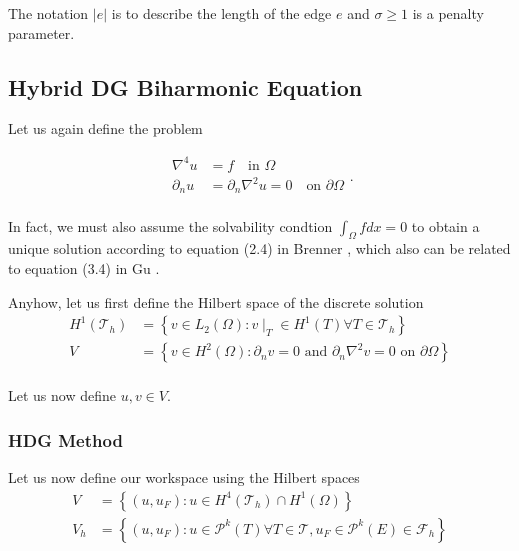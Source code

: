 The notation $\left\lvert e \right\rvert $ is to describe the length of the edge $e$ and $\sigma  \ge  1$ is a penalty
parameter.




\subsection{Hybrid DG Biharmonic Equation}%
\label{sub:hybrid_dg_biharmonic_equation}

Let us again define the problem

\begin{equation}
\label{eq:HDG_bi_problem}
\begin{split}
    \nabla ^4 u & = f \quad \text{in } \Omega   \\
    \partial _{n} u & = \partial _{n} \nabla ^2 u = 0 \quad \text{on } \partial \Omega   \\
\end{split}
.\end{equation}

In fact, we must also assume the solvability condtion $ \int_{\Omega }^{} f dx = 0$ to obtain a unique solution according to
equation (2.4) in Brenner \cite{brenner2012}, which also can be related to equation (3.4) in Gu \cite{gu2012c0}.

Anyhow,
let us first define the Hilbert space of the discrete solution \[
\begin{split}
    H^{1}\left( \mathcal{T}_{h}  \right)  & = \left\{ v \in L_{2} \left( \Omega  \right) : v  \mid _{T} \in H^{1} \left( T
    \right) \forall T \in \mathcal{T}_{h}    \right\} \\
    V &=  \left\{ v \in H^2\left( \Omega  \right) : \partial _{n} v = 0 \text{ and } \partial _{n} \nabla ^2 v = 0 \text{ on } \partial \Omega  \right\} \\
\end{split}
\]

Let us now define $u,v \in V$.

\subsubsection{HDG Method}%
\label{ssub:dg_method}
Let us now define our workspace using the Hilbert spaces
 \[
\begin{split}
    V &=  \left\{ \left( u, u_{F}  \right): u \in H^{4}\left( \mathcal{T} _{h} \right) \cap H^{1}\left( \Omega  \right)   \right\} \\
    V_{h} &=  \left\{ \left( u, u_{F}  \right) : u \in \mathcal{P} ^{k}\left( T \right) \forall T \in  \mathcal{T} ,
    u_{F} \in \mathcal{P} ^{k}\left( E \right) \in  \mathcal{F}_{h}    \right\} \\
\end{split}
\]

